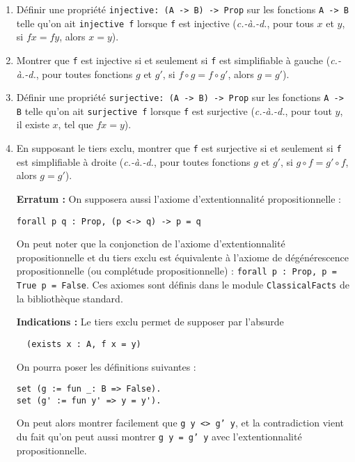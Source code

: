 \documentclass{article}
\begin{document}
\begin{enumerate}
\item Définir une propriété \texttt{injective: (A -> B) -> Prop} sur
les fonctions \texttt{A -> B} telle qu'on ait
\texttt{injective f} lorsque \texttt{f} est injective
(\emph{c.-à.-d.}, pour tous \(x\) et \(y\), si \(f x = f y\), alors \(x = y\)).
\item Montrer que \texttt{f} est injective si et seulement si
\texttt{f} est simplifiable à gauche
(\emph{c.-à.-d.}, pour toutes fonctions \(g\) et \(g'\), si \(f \circ g = f \circ g'\),
alors \(g = g'\)).
\item Définir une propriété \texttt{surjective: (A -> B) -> Prop} sur
les fonctions \texttt{A -> B} telle qu'on ait
\texttt{surjective f} lorsque \texttt{f} est surjective
(\emph{c.-à.-d.}, pour tout \(y\), il existe \(x\), tel que \(f x = y\)).
\item En supposant le tiers exclu, montrer que \texttt{f} est surjective si et seulement si
\texttt{f} est simplifiable à droite
(\emph{c.-à.-d.}, pour toutes fonctions \(g\) et \(g'\), si \(g \circ f = g' \circ f\),
alors \(g = g'\)).

\textbf{Erratum :} On supposera aussi l'axiome d'extentionnalité propositionnelle :

\texttt{forall p q : Prop, (p <-> q) -> p = q}

On peut noter que la conjonction de l'axiome d'extentionnalité propositionnelle et du tiers exclu est équivalente à l'axiome de dégénérescence propositionnelle (ou complétude propositionnelle) : \texttt{forall p : Prop, p = True \/ p = False}. Ces axiomes sont définis dans le module \texttt{ClassicalFacts} de la bibliothèque standard.

\textbf{Indications :} Le tiers exclu permet de supposer par l'absurde 

\texttt{~ (exists x : A, f x = y)}

On pourra poser les définitions suivantes :
\begin{verbatim}
set (g := fun _: B => False).
set (g' := fun y' => y = y').
\end{verbatim}

On peut alors montrer facilement que \texttt{g y <> g' y}, et la contradiction vient du fait qu'on peut aussi montrer \texttt{g y = g' y} avec l'extentionnalité propositionnelle.


\end{enumerate}
\end{document}
